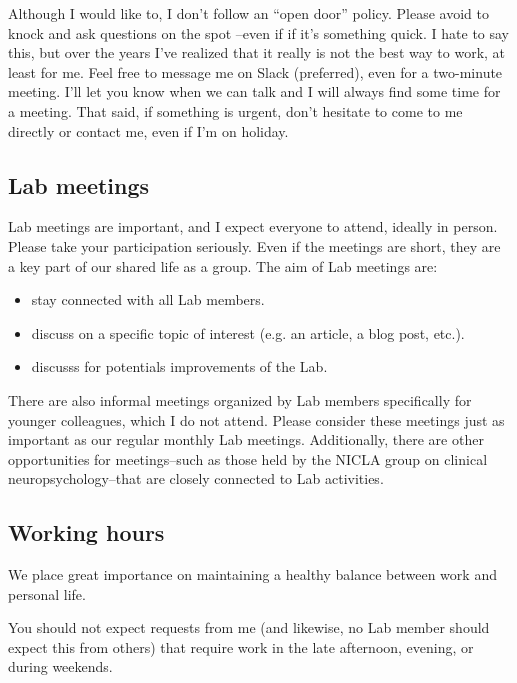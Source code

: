 \documentclass[12pt]{article}
\begin{document}
Although I would like to, I don't follow an ``open door'' policy. Please avoid to knock and ask questions on the spot --even if if it's something quick. I hate to say this, but over the years I've realized that it really is not the best way to work, at least for me.
Feel free to message me on Slack (preferred), even for a two-minute meeting. I'll let you know when we can talk and I will always find some time for a meeting.
That said, if something is urgent, don't hesitate to come to me directly or contact me, even if I'm on holiday.

\subsection{Lab meetings}

Lab meetings are important, and I expect everyone to attend, ideally in person. Please take your participation seriously. Even if the meetings are short, they are a key part of our shared life as a group.
The aim of Lab meetings are:
\begin{itemize}
\item stay connected with all Lab members.
\item discuss on a specific topic of interest (e.g. an article, a blog post, etc.).
\item discusss for potentials improvements of the Lab.
\end{itemize}
There are also informal meetings organized by Lab members specifically for younger colleagues, which I do not attend. Please consider these meetings just as important as our regular monthly Lab meetings.
Additionally, there are other opportunities for meetings--such as those held by the NICLA group on clinical neuropsychology--that are closely connected to Lab activities.


\subsection{Working hours}
We place great importance on maintaining a healthy balance between work and personal life.

\begin{tcolorbox}[
    colback=red!5,
    colframe=red!70!black,
    boxrule=1pt,
    leftrule=4pt,
    arc=2pt,
colbacktitle=red!70!black,   %
    title={\textbf{Important}},
    fonttitle=\bfseries\color{red!0!white}
]
You should not expect requests from me (and 
likewise, no Lab member should expect this from others) that require 
work in the late afternoon, evening, or during weekends.
\end{tcolorbox}
\end{document}
